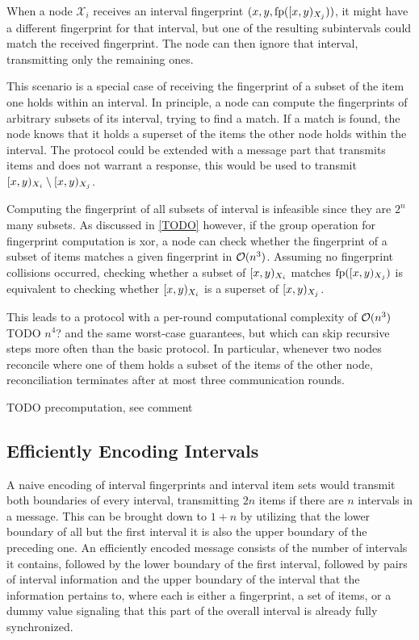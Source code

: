 When a node $\mathcal{X}_i$ receives an interval fingerprint $({x}, {y}, {\operatorname{fp}([{x},{y})_{X_j})})$, it might have a different fingerprint for that interval, but one of the resulting subintervals could match the received fingerprint. The node can then ignore that interval, transmitting only the remaining ones.

This scenario is a special case of receiving the fingerprint of a subset of the item one holds within an interval. In principle, a node can compute the fingerprints of arbitrary subsets of its interval, trying to find a match. If a match is found, the node knows that it holds a superset of the items the other node holds within the interval. The protocol could be extended with a message part that transmits items and does not warrant a response, this would be used to transmit $[{x},{y})_{X_i} \setminus [{x},{y})_{X_j}$.

Computing the fingerprint of all subsets of interval is infeasible since they are $2^n$ many subsets. As discussed in \cref{TODO} however, if the group operation for fingerprint computation is xor, a node can check whether the fingerprint of a subset of items matches a given fingerprint in $\mathcal{O}(n^3)$.
Assuming no fingerprint collisions occurred, checking whether a subset of $[{x},{y})_{X_i}$ matches $\operatorname{fp}([{x},{y})_{X_j})$ is equivalent to checking whether $[{x},{y})_{X_i}$ is a superset of $[{x},{y})_{X_j}$.

This leads to a protocol with a per-round computational complexity of $\mathcal{O}(n^3)$ TODO $n^4$? and the same worst-case guarantees, but which can skip recursive steps more often than the basic protocol. In particular, whenever two nodes reconcile where one of them holds a subset of the items of the other node, reconciliation terminates after at most three communication rounds.

TODO precomputation, see comment %

\subsection{Efficiently Encoding Intervals}

A naive encoding of interval fingerprints and interval item sets would transmit both boundaries of every interval, transmitting $2n$ items if there are $n$ intervals in a message. This can be brought down to $1 + n$ by utilizing that the lower boundary of all but the first interval it is also the upper boundary of the preceding one. An efficiently encoded message consists of the number of intervals it contains, followed by the lower boundary of the first interval, followed by pairs of interval information and the upper boundary of the interval that the information pertains to, where each  is either a fingerprint, a set of items, or a dummy value signaling that this part of the overall interval is already fully synchronized.

